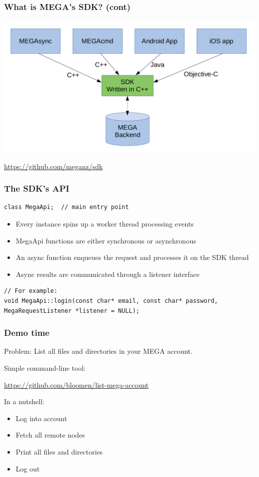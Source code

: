 \documentclass[11pt]{beamer}
\begin{document}
\begin{frame}[fragile]
\frametitle{What is MEGA's SDK? (cont)}
\bigskip

\begin{center}
\includegraphics[width=1\textwidth]{img/sdk}
\end{center}
\medskip

\url{https://github.com/meganz/sdk}
\end{frame}

\begin{frame}[fragile]
\frametitle{The SDK's API}

\begin{lstlisting}
class MegaApi;  // main entry point
\end{lstlisting}
\bigskip

\begin{itemize}
\item Every instance spins up a worker thread processing events
\item MegaApi functions are either synchronous or asynchronous
\item An async function enqueues the request and processes it on the SDK thread
\item Async results are communicated through a listener interface
\end{itemize}
\bigskip

\begin{lstlisting}
// For example:
void MegaApi::login(const char* email, const char* password, MegaRequestListener *listener = NULL);
\end{lstlisting}

\end{frame}

\begin{frame}[fragile]
\frametitle{Demo time}

Problem: List all files and directories in your MEGA account.
\bigskip
\bigskip

Simple command-line tool:

\url{https://github.com/bloomen/list-mega-account}
\bigskip
\bigskip

In a nutshell:
\begin{itemize}
\item Log into account
\item Fetch all remote nodes
\item Print all files and directories
\item Log out
\end{itemize}

\end{frame}
\end{document}

